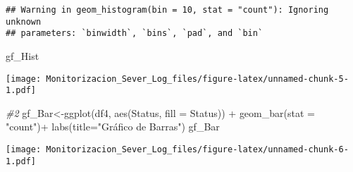 \documentclass[
]{article}
\newenvironment{Shaded}{\begin{snugshade}}{\end{snugshade}}
\newcommand{\AttributeTok}[1]{\textcolor[rgb]{0.77,0.63,0.00}{#1}}
\newcommand{\CommentTok}[1]{\textcolor[rgb]{0.56,0.35,0.01}{\textit{#1}}}
\newcommand{\FunctionTok}[1]{\textcolor[rgb]{0.00,0.00,0.00}{#1}}
\newcommand{\NormalTok}[1]{#1}
\newcommand{\OtherTok}[1]{\textcolor[rgb]{0.56,0.35,0.01}{#1}}
\newcommand{\SpecialCharTok}[1]{\textcolor[rgb]{0.00,0.00,0.00}{#1}}
\newcommand{\StringTok}[1]{\textcolor[rgb]{0.31,0.60,0.02}{#1}}
\begin{document}
\begin{verbatim}
## Warning in geom_histogram(bin = 10, stat = "count"): Ignoring unknown
## parameters: `binwidth`, `bins`, `pad`, and `bin`
\end{verbatim}

\begin{Shaded}
\begin{Highlighting}[]
\NormalTok{gf\_Hist}
\end{Highlighting}
\end{Shaded}

\texttt{[image: Monitorizacion\_Sever\_Log\_files/figure-latex/unnamed-chunk-5-1.pdf]}

\begin{Shaded}
\begin{Highlighting}[]
\CommentTok{\#2}
\NormalTok{gf\_Bar}\OtherTok{\textless{}{-}}\FunctionTok{ggplot}\NormalTok{(df4, }\FunctionTok{aes}\NormalTok{(Status, }\AttributeTok{fill =}\NormalTok{ Status)) }\SpecialCharTok{+} \FunctionTok{geom\_bar}\NormalTok{(}\AttributeTok{stat =} \StringTok{"count"}\NormalTok{)}\SpecialCharTok{+}
  \FunctionTok{labs}\NormalTok{(}\AttributeTok{title=}\StringTok{"Gráfico de Barras"}\NormalTok{)}
\NormalTok{gf\_Bar}
\end{Highlighting}
\end{Shaded}

\texttt{[image: Monitorizacion\_Sever\_Log\_files/figure-latex/unnamed-chunk-6-1.pdf]}
\end{document}
